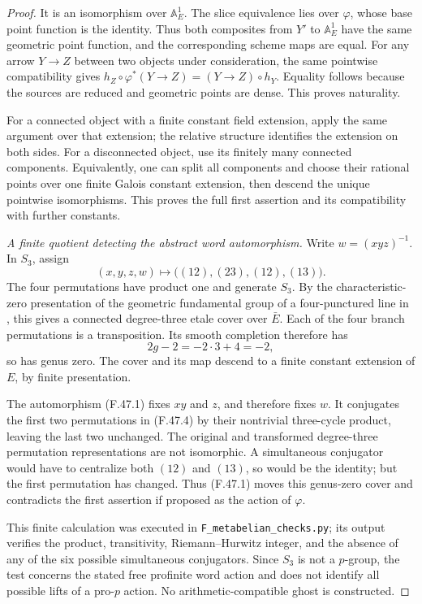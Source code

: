 \documentclass[11pt]{article}
\begin{document}
\begin{proof}
It is an isomorphism over \(\mathbb A^1_E\).
The slice equivalence lies over \(\varphi\), whose
base point function is the identity. Thus both composites
from \(Y'\) to \(\mathbb A^1_E\) have the same
geometric point function, and the corresponding scheme
maps are equal. For any arrow \(Y\to Z\) between
two objects under consideration, the same pointwise
compatibility gives
\(h_Z\circ\varphi^*(Y\to Z)=(Y\to Z)\circ h_Y\).
Equality follows because the sources are reduced and
geometric points are dense. This proves naturality.

For a connected object with a finite constant field
extension, apply the same argument over that extension;
the relative structure identifies the extension on both
sides. For a disconnected object, use its finitely many
connected components. Equivalently, one can split all
components and choose their rational points over one
finite Galois constant extension, then descend the unique
pointwise isomorphisms. This proves the full first
assertion and its compatibility with further constants.

\emph{A finite quotient detecting the abstract word automorphism.}
Write \(w=(xyz)^{-1}\). In \(S_3\), assign
\[
           (x,y,z,w)\longmapsto
           \big((12),(23),(12),(13)\big).
                                                        \tag{F.47.4}
\]
The four permutations have product one and generate
\(S_3\). By the characteristic-zero presentation of the
geometric fundamental group of a four-punctured line
in \citet[Expos\'e~XIII, Corollary~2.12]{FF_SGA1},
this gives a connected degree-three etale cover over
\(\bar E\). Each of the four branch permutations
is a transposition. Its smooth completion therefore has
\[
                         2g-2=-2\cdot3+4=-2,
\]
so has genus zero. The cover and its map descend to a
finite constant extension of \(E\), by finite
presentation.

The automorphism (F.47.1) fixes \(xy\) and \(z\),
and therefore fixes \(w\). It conjugates the first
two permutations in (F.47.4) by their nontrivial
three-cycle product, leaving the last two unchanged.
The original and transformed degree-three permutation
representations are not isomorphic. A simultaneous
conjugator would have to centralize both \((12)\) and
\((13)\), so would be the identity; but the first
permutation has changed. Thus (F.47.1) moves this
genus-zero cover and contradicts the first assertion
if proposed as the action of \(\varphi\).

This finite calculation was executed in
\texttt{F\_metabelian\_checks.py}; its output verifies
the product, transitivity, Riemann--Hurwitz integer, and
the absence of any of the six possible simultaneous
conjugators. Since \(S_3\) is not a \(p\)-group,
the test concerns the stated free profinite word action
and does not identify all possible lifts of a pro-\(p\)
action. No arithmetic-compatible ghost is constructed.
\end{proof}
\end{document}
